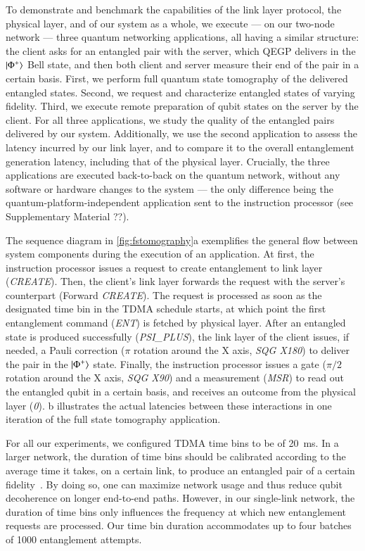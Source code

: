 To demonstrate and benchmark the capabilities of the link layer protocol, the physical layer, and of
our system as a whole, we execute --- on our two-node network --- three quantum networking
applications, all having a similar structure: the client asks for an entangled pair with the server,
which QEGP delivers in the $\ket{\Phi^+}$ Bell state, and then both client and server measure their
end of the pair in a certain basis. First, we perform full quantum state tomography of the delivered
entangled states. Second, we request and characterize entangled states of varying fidelity. Third,
we execute remote preparation of qubit states on the server by the client. For all three
applications, we study the quality of the entangled pairs delivered by our system. Additionally, we
use the second application to assess the latency incurred by our link layer, and to compare it to
the overall entanglement generation latency, including that of the physical layer. Crucially, the
three applications are executed back-to-back on the quantum network, without any software or
hardware changes to the system --- the only difference being the quantum-platform-independent
application sent to the instruction processor (see Supplementary Material ??).

The sequence diagram in \cref{fig:fstomography}a exemplifies the general flow between system
components during the execution of an application. At first, the instruction processor issues a
request to create entanglement to link layer (\emph{CREATE}). Then, the client's link layer forwards
the request with the server's counterpart (Forward \emph{CREATE}). The request is processed as soon
as the designated time bin in the TDMA schedule starts, at which point the first entanglement
command (\emph{ENT}) is fetched by physical layer. After an entangled state is produced successfully
(\emph{PSI\_PLUS}), the link layer of the client issues, if needed, a Pauli correction ($\pi$
rotation around the X axis, \emph{SQG X180}) to deliver the pair in the $\ket{\Phi^+}$ state.
Finally, the instruction processor issues a gate ($\pi/2$ rotation around the X axis, \emph{SQG
X90}) and a measurement (\emph{MSR}) to read out the entangled qubit in a certain basis, and
receives an outcome from the physical layer (\emph{0}). b illustrates the
actual latencies between these interactions in one iteration of the full state tomography
application.

For all our experiments, we configured TDMA time bins to be of \qty{20}{\ms}. In a larger network,
the duration of time bins should be calibrated according to the average time it takes, on a certain
link, to produce an entangled pair of a certain fidelity~\cite{skrzypczyk_2021_arch}. By doing so,
one can maximize network usage and thus reduce qubit decoherence on longer end-to-end paths.
However, in our single-link network, the duration of time bins only influences the frequency at
which new entanglement requests are processed. Our time bin duration accommodates up to four batches
of \num{1000} entanglement attempts.

